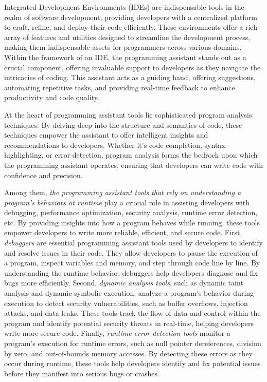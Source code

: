Integrated Development Environments (IDEs) are indispensable tools in the realm of software development, providing developers with a centralized platform to craft, refine, and deploy their code efficiently. These environments offer a rich array of features and utilities designed to streamline the development process, making them indispensable assets for programmers across various domains. Within the framework of an IDE, the programming assistant stands out as a crucial component, offering invaluable support to developers as they navigate the intricacies of coding. This assistant acts as a guiding hand, offering suggestions, automating repetitive tasks, and providing real-time feedback to enhance productivity and code quality.

At the heart of programming assistant tools lie sophisticated program analysis techniques. By delving deep into the structure and semantics of code, these techniques empower the assistant to offer intelligent insights and recommendations to developers. Whether it's code completion, syntax highlighting, or error detection, program analysis forms the bedrock upon which the programming assistant operates, ensuring that developers can write code with confidence and precision.

Among them, {\em the programming assistant tools that rely on
understanding a program's behaviors at runtime} play a crucial role in
assisting developers with debugging, performance optimization,
security analysis, runtime error detection, etc. By providing insights
into how a program behaves while running, these tools empower
developers to write more reliable, efficient, and secure code. First,
{\em debuggers} are essential programming assistant tools used by
developers to identify and resolve issues in their code. They allow
developers to pause the execution of a program, inspect variables and
memory, and step through code line by line. By understanding the
runtime behavior, debuggers help developers diagnose and fix bugs more
efficiently. Second, {\em dynamic analysis tools}, such as dynamic
taint analysis and dynamic symbolic execution, analyze a program's
behavior during execution to detect security vulnerabilities, such as
buffer overflows, injection attacks, and data leaks. These tools track
the flow of data and control within the program and identify potential
security threats in real-time, helping developers write more secure
code. Finally, {\em runtime error detection tools} monitor a program's
execution for runtime errors, such as null pointer dereferences,
division by zero, and out-of-bounds memory accesses. By detecting
these errors as they occur during runtime, these tools help developers
identify and fix potential issues before they manifest into serious
bugs or crashes.


